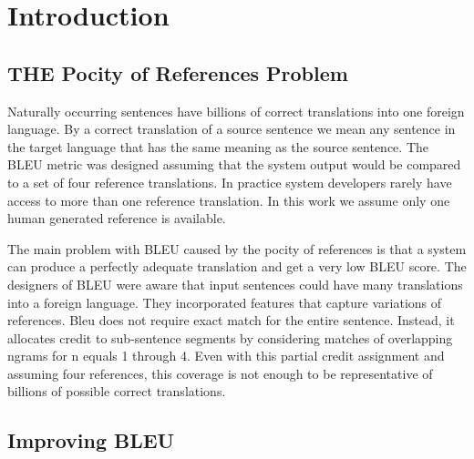 \section{Introduction}
\label{sec:intro}


\subsection{THE Pocity of References Problem}
\label{sec:pocityprob}

Naturally occurring sentences have billions of correct translations into one foreign language\cite{dreyer-marcu:2012:NAACL-HLT}. 
By a correct translation of a source sentence we mean any sentence in the target language that has the same meaning as the source sentence. 
The BLEU\cite{papineni-02} metric was designed assuming that the system output would be compared to a set of four reference translations. 
In practice system developers rarely have access to more than one  reference translation. 
In this work we assume only one human generated reference is available. 


The main problem with BLEU caused by the pocity of references is that a system can produce a perfectly adequate translation and get a very low BLEU score. 
The designers of BLEU were aware that input sentences could have many translations into a foreign language. 
They incorporated features that capture variations of references. 
Bleu does not require exact match for the entire sentence. 
Instead, it allocates credit to sub-sentence segments by considering matches  of overlapping ngrams for   n equals 1 through 4.
Even with this partial credit assignment and assuming four references,  this coverage is not enough to be representative of billions of possible correct translations. 

\subsection{Improving BLEU}
\label{sec:improvebleu}

